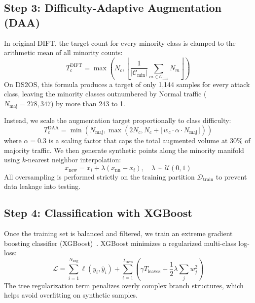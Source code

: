 \subsection{Step 3: Difficulty-Adaptive Augmentation (DAA)}
In original DIFT, the target count for every minority class is clamped to the arithmetic mean of all minority counts:
\begin{equation}
T_c^{\text{DIFT}} = \max\left(N_c, \left\lfloor \frac{1}{|\mathcal{C}_{\text{min}}|} \sum_{m \in \mathcal{C}_{\text{min}}} N_m \right\rfloor\right)
\label{eq:dift_target}
\end{equation}
On DS2OS, this formula produces a target of only 1,144 samples for every attack class, leaving the minority classes outnumbered by Normal traffic ($N_{\text{maj}} = 278,347$) by more than 243 to 1.

Instead, we scale the augmentation target proportionally to class difficulty:
\begin{equation}
T_c^{\text{DAA}} = \min\left( N_{\text{maj}}, \max\left( 2 N_c, N_c + \lfloor w_c \cdot \alpha \cdot N_{\text{maj}} \rfloor \right) \right)
\label{eq:adaptive_target}
\end{equation}
where $\alpha = 0.3$ is a scaling factor that caps the total augmented volume at 30\% of majority traffic. We then generate synthetic points along the minority manifold using $k$-nearest neighbor interpolation:
\begin{equation}
x_{\text{new}} = x_i + \lambda (x_{\text{nn}} - x_i), \quad \lambda \sim \mathcal{U}(0, 1)
\label{eq:smote_interp}
\end{equation}
All oversampling is performed strictly on the training partition $\mathcal{D}_{\text{train}}$ to prevent data leakage into testing.

\subsection{Step 4: Classification with XGBoost}
Once the training set is balanced and filtered, we train an extreme gradient boosting classifier (XGBoost)~\cite{chen2016xgboost}. XGBoost minimizes a regularized multi-class log-loss:
\begin{equation}
\mathcal{L} = \sum_{i=1}^{N_{\text{aug}}} \ell(y_i, \hat{y}_i) + \sum_{t=1}^{T_{\text{trees}}} \left( \gamma T_{\text{leaves}} + \frac{1}{2}\lambda \sum_{j} w_j^2 \right)
\label{eq:xgb_loss}
\end{equation}
The tree regularization term penalizes overly complex branch structures, which helps avoid overfitting on synthetic samples.

